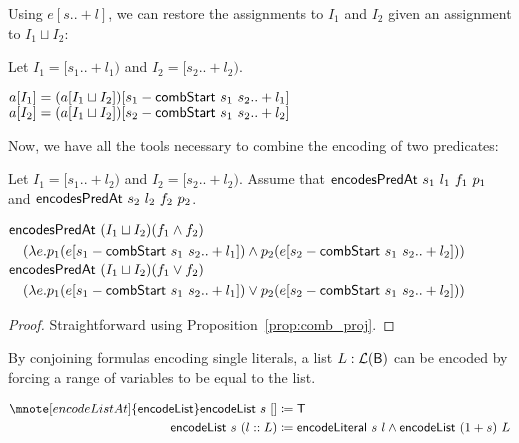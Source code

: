 Using $e[s..+l]$, we can restore the assignments to $I_1$ and $I_2$ given an assignment to $I_1 \sqcup I_2$:
\begin{proposition}\label{prop:comb_proj}
  Let $I_1 = [s_1 ..+ l_1)$ and $I_2 = [s_2 ..+l_2)$. 
  \begin{enumerate}
     $a[I_1] = (a[I_1 \sqcup I_2])[s_1 - \textsf{combStart}~s_1~s_2 .. + l_1]$
     $a[I_2] = (a[I_1 \sqcup I_2])[s_2 - \textsf{combStart}~s_1~s_2 .. + l_2]$
  \end{enumerate}
\end{proposition}

Now, we have all the tools necessary to combine the encoding of two predicates:
\begin{lemma}
  Let $I_1 = [s_1 .. + l_2)$ and $I_2 = [s_2 .. + l_2)$.
  Assume that $\textsf{encodesPredAt}~s_1~l_1~f_1~p_1$ and $\textsf{encodesPredAt}~s_2~l_2~f_2~p_2$. 
  \begin{enumerate}
      $\begin{aligned}[t]
        &\textsf{encodesPredAt} ~(I_1 \sqcup I_2) (f_1 \land f_2) \\ 
        &\quad (\lambda e. p_1 (e[s_1 - \textsf{combStart}~s_1~s_2 .. +l_1]) \land p_2 (e[s_2 - \textsf{combStart}~s_1~s_2 .. + l_2]))
      \end{aligned}$
   \coqitem[encodesPredicate_or]
      $\begin{aligned}[t]
        &\textsf{encodesPredAt} ~(I_1 \sqcup I_2) (f_1 \lor f_2) \\ 
        &\quad (\lambda e. p_1 (e[s_1 - \textsf{combStart}~s_1~s_2 .. +l_1]) \lor p_2 (e[s_2 - \textsf{combStart}~s_1~s_2 .. + l_2]))
      \end{aligned}$
  \end{enumerate}
\end{lemma}
\begin{proof}
  Straightforward using Proposition~\ref{prop:comb_proj}.
\end{proof}

By conjoining formulas encoding single literals, a list $L : \mathcal{L} (\textsf{B})$ can be encoded by forcing a range of variables to be equal to the list. 

\newcommand{\encodeList}{\textsf{encodeList}}
\begin{align*}
  \mnote[encodeListAt]{\encodeList}
  \encodeList~s~\nil &\defeq \btrue \\
  \encodeList~s~(l :: L) &\defeq \encodeLiteral~s~l \land \encodeList~(\natS{s})~L
\end{align*}

